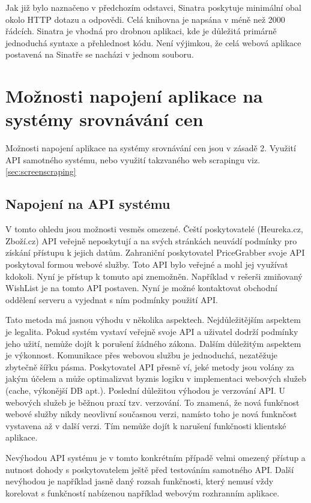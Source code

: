 Jak již bylo naznačeno v předchozím odstavci, Sinatra poskytuje minimální obal okolo HTTP dotazu a odpovědi. Celá knihovna je napsána v méně než 2000 řádcích\cite{harris2011sinatra}. Sinatra je vhodná pro drobnou aplikaci, kde je důležitá primárně jednoduchá syntaxe a přehlednost kódu. Není výjimkou, že celá webová aplikace postavená na Sinatře se nacházi v jednom souboru\cite{harris2011sinatra}.

\section{Možnosti napojení aplikace na systémy srovnávání cen}
Možnosti napojení aplikace na systémy srovnávání cen jsou v zásadě 2. Využití API samotného systému, nebo využití takzvaného web scrapingu viz. \ref{sec:screenscraping}

\subsection{Napojení na API systému}
V tomto ohledu jsou možnosti vesměs omezené. Čeští poskytovatelé (Heureka.cz, Zboží.cz) API veřejně neposkytují a na svých stránkách neuvádí podmínky pro získání přístupu k jejich datům. Zahraniční poskytovatel PriceGrabber svoje API poskytoval formou webové služby. Toto API bylo veřejné a mohl jej využívat kdokoli. Nyní je přístup k tomuto api znemožněn\cite{website:pricegrabber-api}. Například v rešerši zmiňovaný WishList je na tomto API postaven. Nyní je možné kontaktovat obchodní oddělení serveru a vyjednat s ním podmínky použití API.

Tato metoda má jasnou výhodu v několika aspektech. Nejdůležitějším aspektem je legalita. Pokud systém vystaví veřejně svoje API a uživatel dodrží podmínky jeho užití, nemůže dojít k porušení žádného zákona. Dalším důležitým aspektem je výkonnost. Komunikace přes webovou službu je jednoduchá, nezatěžuje zbytečně šířku pásma. Poskytovatel API přesně ví, jeké metody jsou volány za jakým účelem a může optimalizvat byznis logiku v implementaci webových služeb (cache, výkonější DB apt.). Poslední důležitou výhodou je verzování API. U webových služeb je běžnou praxí tzv. verzování\cite{josuttis2007soa}. To znamená, že nová funkčnost webové služby nikdy neovlivní současnou verzi, namísto toho je nová funknčost vystavena až v další verzi. Tím nemůže dojít k narušení funkčnosti klientské aplikace.

Nevýhodou API systému je v tomto konkrétním případě velmi omezený přístup a nutnost dohody s poskytovatelem ještě před testováním samotného API. Další nevýhodou je například jasně daný rozsah funkčnosti, který nemusí vždy korelovat s funkčností nabízenou například webovým rozhranním aplikace.

